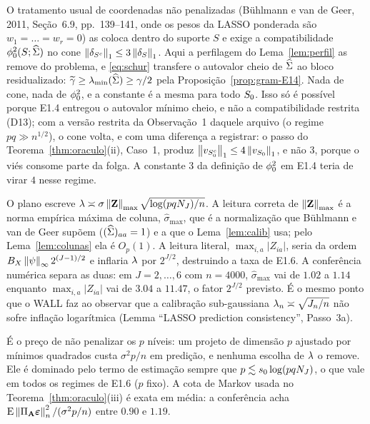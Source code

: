 \documentclass[11pt,a4paper]{article}
\newcommand{\lmin}{\lambda_{\min}}
\newcommand{\Amat}{\mathbf{A}}
\newcommand{\PA}{\Pi_{\Amat}}
\newcommand{\bveps}{\boldsymbol{\varepsilon}}
\newcommand{\smax}{\widehat{\sigma}_{\max}}
\newcommand{\gtil}{\widetilde{\gamma}}
\begin{document}
\begin{remark}\label{rem:cone}
O tratamento usual de coordenadas não penalizadas (Bühlmann e van de Geer,
2011, Seção~6.9, pp.~139--141, onde os pesos da LASSO ponderada são
$w_{1} = \dots = w_{r} = 0$) as coloca dentro do suporte $S$ e exige a compatibilidade
$\phi_{0}^{2}(S;\widehat{\Sigma})$ no cone $\left\lVert \delta_{S^{c}} \right\rVert_{1} \le
3\left\lVert \delta_{S} \right\rVert_{1}$. Aqui a perfilagem do Lema~\ref{lem:perfil} as remove
do problema, e \eqref{eq:schur} transfere o autovalor cheio de $\widehat{\Sigma}$ ao
bloco residualizado: $\gtil \ge \lmin(\Gramhat) \ge \gamma/2$ pela
Proposição~\ref{prop:gram-E14}. Nada de cone, nada de $\phi_{0}^{2}$, e a
constante é a mesma para todo $S_{0}$. Isso só é possível porque E1.4
entregou o autovalor mínimo cheio, e não a compatibilidade restrita (D13); com
a versão restrita da Observação~1 daquele arquivo (o regime $pq \gg n^{1/2}$),
o cone volta, e com uma diferença a registrar: o passo do
Teorema~\ref{thm:oraculo}(ii), Caso~1, produz
$\left\lVert v_{S_{0}^{c}} \right\rVert_{1} \le 4\left\lVert v_{S_{0}} \right\rVert_{1}$, e não $3$, porque o
viés consome parte da folga. A constante $3$ da definição de $\phi_{0}^{2}$ em
E1.4 teria de virar $4$ nesse regime.
\end{remark}

\begin{remark}\label{rem:calib}
O plano escreve $\lambda \asymp \sigma\left\lVert \mathbf{Z} \right\rVert_{\max}\sqrt{\log(pqN_{J})/n}$. A
leitura correta de $\left\lVert \mathbf{Z} \right\rVert_{\max}$ é a norma empírica máxima de coluna,
$\smax$, que é a normalização que Bühlmann e van de Geer supõem
($(\widehat{\Sigma})_{aa} = 1$) e a que o Lema~\ref{lem:calib} usa; pelo
Lema~\ref{lem:colunas} ela é $O_{p}(1)$. A leitura literal,
$\max_{i,a}|Z_{ia}|$, seria da ordem $B_{X}\left\lVert \psi \right\rVert_{\infty}2^{(J-1)/2}$ e
inflaria $\lambda$ por $2^{J/2}$, destruindo a taxa de E1.6. A conferência
numérica separa as duas: em $J = 2, \dots, 6$ com $n = 4000$, $\smax$ vai de
$1.02$ a $1.14$ enquanto $\max_{i,a}|Z_{ia}|$ vai de $3.04$ a $11.47$, o fator
$2^{J/2}$ previsto. É o mesmo ponto que o WALL faz ao observar que a
calibração sub-gaussiana $\lambda_{n} \asymp \sqrt{J_{n}/n}$ não sofre inflação
logarítmica (Lemma ``LASSO prediction consistency'', Passo~3a).
\end{remark}

\begin{remark}\label{rem:pn}
É o preço de não penalizar os $p$ níveis: um projeto de dimensão $p$ ajustado
por mínimos quadrados custa $\sigma^{2}p/n$ em predição, e nenhuma escolha de
$\lambda$ o remove. Ele é dominado pelo termo de estimação sempre que
$p \lesssim s_{0}\log(pqN_{J})$, o que vale em todos os regimes de E1.6 ($p$
fixo). A cota de Markov usada no Teorema~\ref{thm:oraculo}(iii) é exata em
média: a conferência acha $\E\normn{\PA\bveps}^{2}/(\sigma^{2}p/n)$ entre
$0.90$ e $1.19$.
\end{remark}
\end{document}

